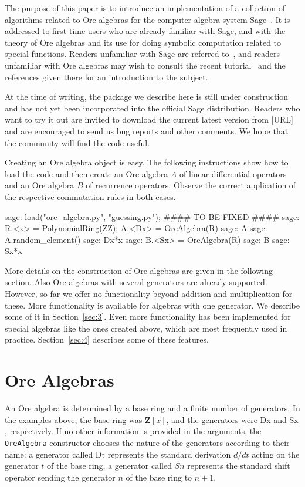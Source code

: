 \documentclass{amsart}
\def\Bold#1{\mathbf{#1}}
\begin{document}
The purpose of this paper is to introduce an implementation of a collection of
algorithms related to Ore algebras for the computer algebra system
Sage~\cite{sage}. It is addressed to first-time users who are already familiar
with Sage, and with the theory of Ore algebras and its use for doing symbolic
computation related to special functions. Readers unfamiliar with Sage are referred
to~\cite{sage}, and readers unfamiliar with Ore algebras may wish to consult the
recent tutorial~\cite{kauers13} and the references given there for an introduction to
the subject.

At the time of writing, the package we describe here is still under construction
and has not yet been incorporated into the official Sage distribution. Readers
who want to try it out are invited to download the current latest version from 
[URL] and are encouraged to send us bug reports and other comments. We hope 
that the community will find the code useful.

Creating an Ore algebra object is easy. The following instructions show how to 
load the code and then create an Ore algebra $A$ of linear differential operators
and an Ore algebra $B$ of recurrence operators. Observe the correct application
of the respective commutation rules in both cases. 

\begin{sageexample}
  sage: load("ore_algebra.py", "guessing.py");  #### TO BE FIXED ####
  sage: R.<x> = PolynomialRing(ZZ); A.<Dx> = OreAlgebra(R)
  sage: A
  sage: A.random_element()
  sage: Dx*x
  sage: B.<Sx> = OreAlgebra(R)
  sage: B
  sage: Sx*x
\end{sageexample}

More details on the construction of Ore algebras are given in the following section.
Also Ore algebras with several generators are already supported. However, so far we offer
no functionality beyond addition and multiplication for these. More functionality 
is available for algebras with one generator. We describe some of it in 
Section~\ref{sec:3}. Even more functionality has been implemented for special 
algebras like the ones created above, which are most frequently used in practice. 
Section~\ref{sec:4} describes some of these features. 

\section{Ore Algebras}

An Ore algebra is determined by a base ring and a finite number of generators.
In the examples above, the base ring was $\Bold{Z}[x]$, and the generators were
$\mathrm{Dx}$ and $\mathrm{Sx}$, respectively. If no other information is provided
in the arguments, the \verb|OreAlgebra| constructor chooses the nature of the 
generators according to their name: a generator called $\mathrm{Dt}$ represents
the standard derivation $d/dt$ acting on the generator $t$ of the base ring, 
a generator called $Sn$ represents the standard shift operator sending the
generator $n$ of the base ring to $n+1$. 
\end{document}
